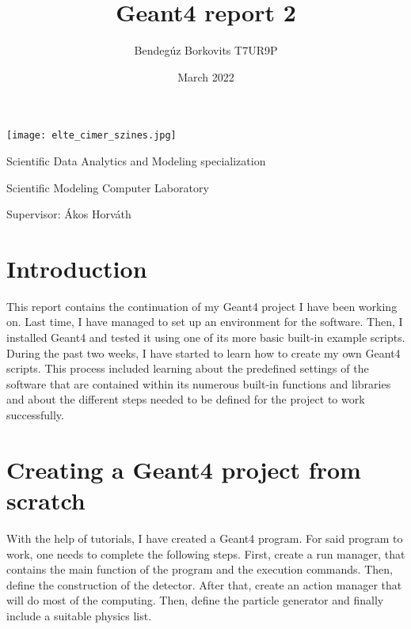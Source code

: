 \documentclass[a4paper,12pt]{extarticle}
\title{Geant4 report 2}
\author{Bendegúz Borkovits T7UR9P}
\date{March 2022}
\begin{document}
\onehalfspacing

\maketitle

\begin{center}

\texttt{[image: elte\_cimer\_szines.jpg]}

\vspace{2 cm}
Scientific Data Analytics and Modeling specialization

Scientific Modeling Computer Laboratory

Supervisor: Ákos Horváth

\vspace{1 cm}

\end{center}

\section{Introduction}
This report contains the continuation of my Geant4 project I have been working on. Last time, I have managed to set up an environment for the software. Then, I installed Geant4 and tested it using one of its more basic built-in example scripts. During the past two weeks, I have started to learn how to create my own Geant4 scripts. This process included learning about the predefined settings of the software that are contained within its numerous built-in functions and libraries and about the different steps needed to be defined for the project to work successfully. 

\section{Creating a Geant4 project from scratch}
With the help of tutorials, I have created a Geant4 program. For said program to work, one needs to complete the following steps. First, create a run manager, that contains the main function of the program and the execution commands. Then, define the construction of the detector. After that, create an action manager that will do most of the computing. Then, define the particle generator and finally include a suitable physics list.
\end{document}
